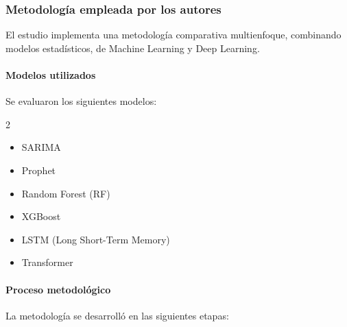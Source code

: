 \subsubsection{Metodología empleada por los autores}

El estudio implementa una metodología comparativa multienfoque, combinando modelos estadísticos, de Machine Learning y Deep Learning.

\paragraph{Modelos utilizados}

Se evaluaron los siguientes modelos:
\begin{multicols}{2}
\begin{itemize}
    \item SARIMA
    \item Prophet
    \item Random Forest (RF)
    \item XGBoost
    \item LSTM (Long Short-Term Memory)
    \item Transformer
\end{itemize}
\end{multicols}

\paragraph{Proceso metodológico}

La metodología se desarrolló en las siguientes etapas:

